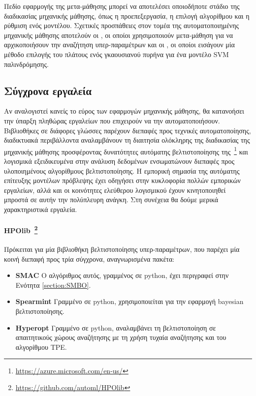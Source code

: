  Πεδίο εφαρμογής της μετα-μάθησης μπορεί να αποτελέσει οποιοδήποτε στάδιο της διαδικασίας μηχανικής μάθησης, όπως η προεπεξεργασία, η επιλογή αλγορίθμου και η ρύθμιση ενός μοντέλου. Σχετικές προσπάθειες στον τομέα της αυτοματοποιημένης μηχανικής μάθησης αποτελούν οι \citet{AAAI1510029}, οι οποίοι χρησιμοποιούν μετα-μάθηση για να αρχικοποιήσουν την αναζήτηση υπερ-παραμέτρων και οι \citet{Soares2004}, οι οποίοι εισάγουν μία μέθοδο επιλογής του πλάτους ενός γκαουσιανού πυρήνα για ένα μοντέλο \gls{SVM} παλινδρόμησης.   
 
 \subsection{Σύγχρονα εργαλεία} \label{section:tools}
 Αν αναλογιστεί κανείς το εύρος των εφαρμογών μηχανικής μάθησης, θα κατανοήσει την ύπαρξη πληθώρας εργαλείων που επιχειρούν να την αυτοματοποιήσουν. Βιβλιοθήκες σε διάφορες γλώσσες παρέχουν διεπαφές προς τεχνικές αυτοματοποίησης, διαδικτυακά περιβάλλοντα αναλαμβάνουν τη διαιτησία ολόκληρης της διαδικασίας της μηχανικής μάθησης προσφέροντας δυνατότητες αυτόματης βελτιστοποίησης της~\footnote{\url{https://azure.microsoft.com/en-us/}} και λογισμικά εξειδικευμένα στην ανάλυση δεδομένων ενσωματώνουν διεπαφές προς υλοποιημένους αλγορίθμους βελτιστοποίησης. Η εμπορική σημασία της αυτόματης επίτευξης μοντέλων πρόβλεψης έχει οδηγήσει στην κυκλοφορία πολλών εμπορικών εργαλείων, αλλά και οι κοινότητες ελεύθερου λογισμικού έχουν κινητοποιηθεί μπροστά σε αυτήν την πολύπλευρη ανάγκη. Στη συνέχεια θα δούμε μερικά χαρακτηριστικά εργαλεία.
 \paragraph[HPOlib]{HPOlib~\footnote{\url{https://github.com/automl/HPOlib}} }  Πρόκειται για μία βιβλιοθήκη βελτιστοποίησης υπερ-παραμέτρων, που παρέχει μία κοινή διεπαφή προς τρία σύγχρονα, αναγνωρισμένα πακέτα: 
 \begin{itemize}
 	\item \textbf{SMAC} Ο αλγόριθμος αυτός, γραμμένος σε python, έχει περιγραφεί στην Ενότητα \ref{section:SMBO}.
 	\item \textbf{Spearmint} Γραμμένο σε python, χρησιμοποιείται για την εφαρμογή bayesian βελτιστοποίησης.
 	\item \textbf{Hyperopt} Γραμμένο σε python, αναλαμβάνει τη βελτιστοποίηση σε απαιτητικούς χώρους αναζήτησης με τη χρήση τυχαία αναζήτησης και του αλγορίθμου TPE.
 \end{itemize}
 
